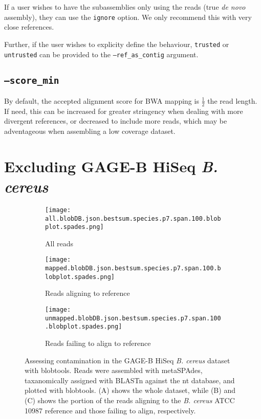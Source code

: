 \documentclass[10pt]{article}
\begin{document}
If a user wishes to have the subassemblies only using the reads (true \textit{de novo} assembly), they can use the \texttt{ignore} option.  We only recommend this with very close references.

Further, if the user wishes to explicity define the behaviour, \texttt{trusted} or \texttt{untrusted} can be provided to the \texttt{--ref\_as\_contig} argument.

\subsection*{\texttt{--score\_min}}
By default, the accepted alignment score for BWA mapping is $\frac{1}{2}$ the read length.  If need, this can be increased for greater stringency when dealing with more divergent references, or decreased to include more reads, which may be adventageous when assembling a low coverage dataset.

\section*{Excluding GAGE-B HiSeq \textit{B. cereus}}

\begin{figure}[H]
  \centering
  \begin{subfigure}[b]{.3\textwidth}
    \texttt{[image: all.blobDB.json.bestsum.species.p7.span.100.blobplot.spades.png]}
    \caption{All reads}
  \end{subfigure}
  \begin{subfigure}[b]{.3\textwidth}
    \texttt{[image: mapped.blobDB.json.bestsum.species.p7.span.100.blobplot.spades.png]}
    \caption{Reads aligning to reference}
  \end{subfigure}
  \begin{subfigure}[b]{.3\textwidth}
    \texttt{[image: unmapped.blobDB.json.bestsum.species.p7.span.100.blobplot.spades.png]}
    \caption{Reads failing to align to reference}
  \end{subfigure}
  \caption{Assessing contamination in the GAGE-B HiSeq \textit{B. cereus} dataset with blobtools. Reads were assembled with metaSPAdes, taxanomically assigned with BLASTn against the nt database, and plotted with blobtools.  (A) shows the whole dataset, while (B) and (C) shows the portion of the reads aligning to the \textit{B. cereus} ATCC 10987 reference and those failing to align, respectively. }
  \label{fig:contamination_all}
\end{figure}
\end{document}
